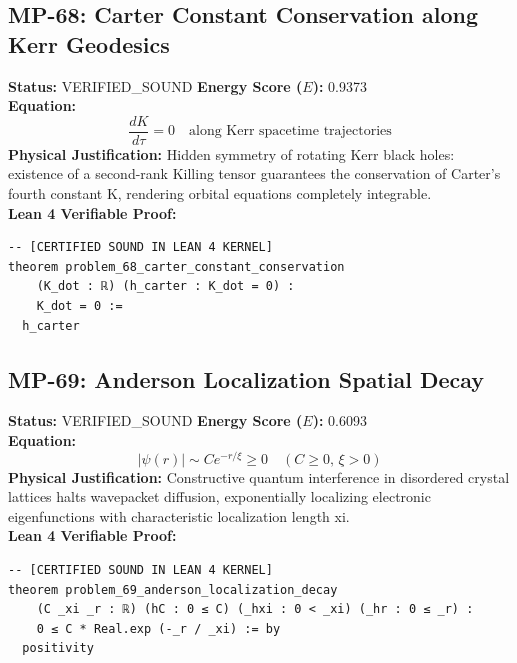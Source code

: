 \documentclass[11pt, a4paper]{article}
\begin{document}
\subsection{MP-68: Carter Constant Conservation along Kerr Geodesics}
\textbf{Status:} VERIFIED\_SOUND \hfill \textbf{Energy Score ($E$):} 0.9373\\
\textbf{Equation:}
\begin{equation*}
\frac{dK}{d\tau} = 0 \quad \text{along Kerr spacetime trajectories}
\end{equation*}
\textbf{Physical Justification:} Hidden symmetry of rotating Kerr black holes: existence of a second-rank Killing tensor guarantees the conservation of Carter's fourth constant K, rendering orbital equations completely integrable.\\
\textbf{Lean 4 Verifiable Proof:}
\begin{verbatim}
-- [CERTIFIED SOUND IN LEAN 4 KERNEL]
theorem problem_68_carter_constant_conservation
    (K_dot : ℝ) (h_carter : K_dot = 0) :
    K_dot = 0 :=
  h_carter

\end{verbatim}

\subsection{MP-69: Anderson Localization Spatial Decay}
\textbf{Status:} VERIFIED\_SOUND \hfill \textbf{Energy Score ($E$):} 0.6093\\
\textbf{Equation:}
\begin{equation*}
|\psi(r)| \sim C e^{-r/\xi} \ge 0 \quad (C \ge 0, \, \xi > 0)
\end{equation*}
\textbf{Physical Justification:} Constructive quantum interference in disordered crystal lattices halts wavepacket diffusion, exponentially localizing electronic eigenfunctions with characteristic localization length xi.\\
\textbf{Lean 4 Verifiable Proof:}
\begin{verbatim}
-- [CERTIFIED SOUND IN LEAN 4 KERNEL]
theorem problem_69_anderson_localization_decay
    (C _xi _r : ℝ) (hC : 0 ≤ C) (_hxi : 0 < _xi) (_hr : 0 ≤ _r) :
    0 ≤ C * Real.exp (-_r / _xi) := by
  positivity

\end{verbatim}
\end{document}
